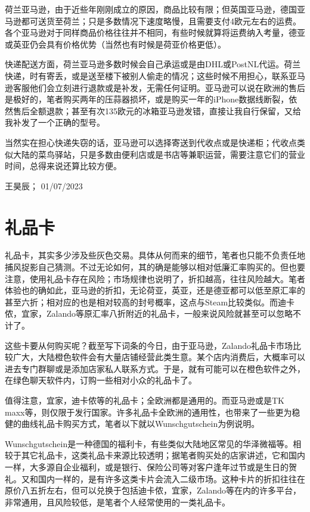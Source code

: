 荷兰亚马逊，由于近些年刚刚成立的原因，商品比较有限；但英国亚马逊，德国亚马逊都可送货至荷兰；只是多数情况下速度略慢，且需要支付4欧元左右的运费。各个亚马逊对于同样商品价格往往并不相同，有些时候就算将运费纳入考量，德亚或英亚仍会具有价格优势（当然也有时候是荷亚价格更低）。

快递配送方面，荷兰亚马逊多数时候会自己承运或是由DHL或PostNL代运。荷兰快递，时有寄丢，或是送至楼下被别人偷走的情况；这些时候不用担心，联系亚马逊客服他们会立刻进行退款或是补发，无需任何证明。亚马逊可以说在欧洲的售后是极好的，笔者购买两年的压蒜器损坏，或是购买一年的iPhone数据线断裂，依然售后全额退款；甚至有次135欧元的冰箱亚马逊发错，直接让我自行保留，又给我补发了一个正确的型号。

当然实在担心快递失窃的话，亚马逊可以选择寄送到代收点或是快递柜；代收点类似大陆的菜鸟驿站，只是多数由便利店或是书店等兼职运营，需要注意它们的营业时间，总得来说还算比较方便。
\begin{flushright}
王昊辰； 01/07/2023
\end{flushright}

\vspace{\betsubsec} %


\section{礼品卡}\hypertarget{礼品卡}{} 
礼品卡，其实多少涉及些灰色交易。具体从何而来的细节，笔者也只能不负责任地捕风捉影自己猜测。不过无论如何，其的确是能够以相对低廉汇率购买的。但也要注意，使用礼品卡存在风险；市场规律也说明了，折扣越高，往往风险越大。笔者体验也的确如此，亚马逊的折扣，无论荷亚，英亚，还是德亚都可以低至原汇率的甚至六折；相对应的也是相对较高的封号概率，这点与Steam比较类似。而迪卡侬，宜家，Zalando等原汇率八折附近的礼品卡，一般来说风险就甚至可以忽略不计了。

这些卡要从何购买呢？截至写下词条的今日，由于亚马逊，Zalando礼品卡市场比较广大，大陆橙色软件会有大量店铺经营此类生意。某个店内消费后，大概率可以进去专门群聊或是添加店家私人联系方式。于是，就有可能可以在橙色软件之外，在绿色聊天软件内，订购一些相对小众的礼品卡了。

值得注意，宜家，迪卡侬等的礼品卡；全欧洲都是通用的。而亚马逊或是TK maxx等，则仅限于发行国家。许多礼品卡全欧洲的通用性，也带来了一些更为稳健的曲线礼品卡购买方式，笔者以下就以Wunschgutschein为例说明。

Wunschgutschein是一种德国的福利卡，有些类似大陆地区常见的华泽微福等。相较于其它礼品卡，这类礼品卡来源比较透明；据笔者购买处的店家讲述，它和国内一样，大多源自企业福利，或是银行、保险公司等对客户逢年过节或是生日的贺礼。又和国内一样的，是有许多这类卡片会流入二级市场。这种卡片的折扣往往在原价八五折左右，但可以兑换于包括迪卡侬，宜家，Zalando等在内的许多平台，非常通用，且风险较低，是笔者个人经常使用的一类礼品卡。

